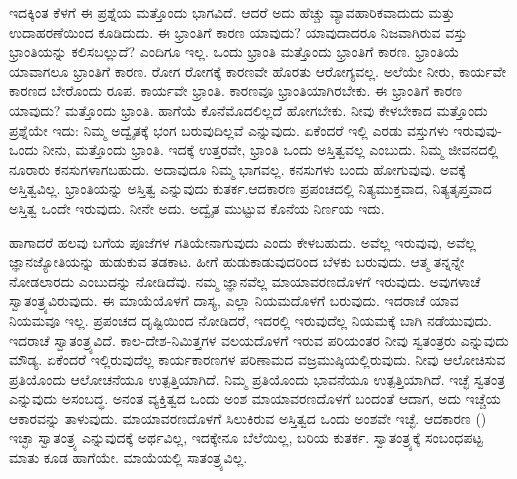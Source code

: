 ಇದಕ್ಕಿಂತ ಕೆಳಗೆ ಈ ಪ್ರಶ್ನೆಯ ಮತ್ತೊಂದು ಭಾಗವಿದೆ. ಆದರೆ ಅದು ಹೆಚ್ಚು ವ್ಯಾವಹಾರಿಕವಾದುದು ಮತ್ತು ಉದಾಹರಣೆಯಿಂದ ಕೂಡಿದುದು. ಈ ಭ್ರಾಂತಿಗೆ ಕಾರಣ ಯಾವುದು? ಯಾವುದಾದರೂ ನಿಜವಾಗಿರುವ ವಸ್ತು ಭ್ರಾಂತಿಯನ್ನು ಕಲಿಸಬಲ್ಲುದೆ? ಎಂದಿಗೂ ಇಲ್ಲ. ಒಂದು ಭ್ರಾಂತಿ ಮತ್ತೊಂದು ಭ್ರಾಂತಿಗೆ ಕಾರಣ. ಭ್ರಾಂತಿಯೆ ಯಾವಾಗಲೂ ಭ್ರಾಂತಿಗೆ ಕಾರಣ. ರೋಗ ರೋಗಕ್ಕೆ ಕಾರಣವೇ ಹೊರತು ಆರೋಗ್ಯವಲ್ಲ. ಅಲೆಯೇ ನೀರು, ಕಾರ್ಯವೇ ಕಾರಣದ ಬೇರೊಂದು ರೂಪ. ಕಾರ್ಯವೇ ಭ್ರಾಂತಿ. ಕಾರಣವೂ ಭ್ರಾಂತಿಯಾಗಿರಬೇಕು. ಈ ಭ್ರಾಂತಿಗೆ ಕಾರಣ ಯಾವುದು? ಮತ್ತೊಂದು ಭ್ರಾಂತಿ. ಹಾಗೆಯೆ ಕೊನೆಮೊದಲಿಲ್ಲದೆ ಹೋಗಬೇಕು. ನೀವು ಕೇಳಬೇಕಾದ ಮತ್ತೊಂದು ಪ್ರಶ್ನೆಯೇ ಇದು: ನಿಮ್ಮ ಅದ್ವೈತಕ್ಕೆ ಭಂಗ ಬರುವುದಿಲ್ಲವೆ ಎನ್ನುವುದು. ಏಕೆಂದರೆ ಇಲ್ಲಿ ಎರಡು ವಸ್ತುಗಳು ಇರುವುವು-ಒಂದು ನೀನು, ಮತ್ತೊಂದು ಭ್ರಾಂತಿ. ಇದಕ್ಕೆ ಉತ್ತರವೇ, ಭ್ರಾಂತಿ ಒಂದು ಅಸ್ತಿತ್ವವಲ್ಲ ಎಂಬುದು. ನಿಮ್ಮ ಜೀವನದಲ್ಲಿ ನೂರಾರು ಕನಸುಗಳಾಗಬಹುದು. ಅದಾವುದೂ ನಿಮ್ಮ ಭಾಗವಲ್ಲ. ಕನಸುಗಳು ಬಂದು ಹೋಗುವುವು. ಅವಕ್ಕೆ ಅಸ್ತಿತ್ವವಿಲ್ಲ. ಭ್ರಾಂತಿಯನ್ನು ಅಸ್ತಿತ್ವ ಎನ್ನುವುದು ಕುತರ್ಕ.\break ಆದಕಾರಣ ಪ್ರಪಂಚದಲ್ಲಿ ನಿತ್ಯಮುಕ್ತವಾದ, ನಿತ್ಯತೃಪ್ತವಾದ ಅಸ್ತಿತ್ವ ಒಂದೇ ಇರುವುದು. ನೀನೇ ಅದು. ಅದ್ವೈತ ಮುಟ್ಟುವ ಕೊನೆಯ ನಿರ್ಣಯ ಇದು.

ಹಾಗಾದರೆ ಹಲವು ಬಗೆಯ ಪೂಜೆಗಳ ಗತಿಯೇನಾಗುವುದು ಎಂದು ಕೇಳಬಹುದು. ಅವೆಲ್ಲ ಇರುವುವು, ಅವೆಲ್ಲ ಜ್ಞಾನಜ್ಯೋತಿಯನ್ನು ಹುಡುಕುವ ತಡಕಾಟ. ಹೀಗೆ ಹುಡುಕಾಡುವುದರಿಂದ ಬೆಳಕು ಬರುವುದು. ಆತ್ಮ ತನ್ನನ್ನೇ ನೋಡಲಾರದು ಎಂಬುದನ್ನು ನೋಡಿದೆವು. ನಮ್ಮ ಜ್ಞಾನವೆಲ್ಲ ಮಾಯಾವರಣದೊಳಗೆ ಇರುವುದು. ಅವುಗಳಾಚೆ ಸ್ವಾತಂತ್ರ್ಯವಿರುವುದು. ಈ ಮಾಯೆಯೊಳಗೆ ದಾಸ್ಯ, ಎಲ್ಲಾ ನಿಯಮದೊಳಗೆ ಬರುವುದು. ಇದರಾಚೆ ಯಾವ ನಿಯಮವೂ ಇಲ್ಲ. ಪ್ರಪಂಚದ ದೃಷ್ಟಿಯಿಂದ ನೋಡಿದರೆ, ಇದರಲ್ಲಿ ಇರುವುದೆಲ್ಲ ನಿಯಮಕ್ಕೆ ಬಾಗಿ ನಡೆಯುವುದು. ಇದರಾಚೆ ಸ್ವಾತಂತ್ರ್ಯವಿದೆ. ಕಾಲ-ದೇಶ-ನಿಮಿತ್ತಗಳ ವಲಯದೊಳಗೆ ಇರುವ ಪರಿಯಂತರ ನೀವು ಸ್ವತಂತ್ರರು ಎನ್ನುವುದು ಮೌಡ್ಯ. ಏಕೆಂದರೆ ಇಲ್ಲಿರುವುದೆಲ್ಲ ಕಾರ್ಯಕಾರಣಗಳ ಪರಿಣಾಮದ ವಜ್ರಮುಷ್ಠಿಯಲ್ಲಿರುವುದು. ನೀವು ಆಲೋಚಿಸುವ ಪ್ರತಿಯೊಂದು ಆಲೋಚನೆಯೂ ಉತ್ಪತ್ತಿಯಾಗಿದೆ. ನಿಮ್ಮ ಪ್ರತಿಯೊಂದು ಭಾವನೆಯೂ ಉತ್ಪತ್ತಿಯಾಗಿದೆ. ಇಚ್ಛೆ ಸ್ವತಂತ್ರ ಎನ್ನುವುದು ಅಸಂಬದ್ಧ. ಅನಂತ ವ್ಯಕ್ತಿತ್ವದ ಒಂದು ಅಂಶ ಮಾಯಾವರಣದೊಳಗೆ ಬಂದಂತೆ ಆದಾಗ, ಅದು ಇಚ್ಚೆಯ ಆಕಾರವನ್ನು ತಾಳುವುದು. ಮಾಯಾವರಣದೊಳಗೆ ಸಿಲುಕಿರುವ ಅಸ್ತಿತ್ವದ ಒಂದು ಅಂಶವೇ ಇಚ್ಛೆ. ಆದಕಾರಣ () ಇಚ್ಛಾ ಸ್ವಾತಂತ್ರ್ಯ ಎನ್ನುವುದಕ್ಕೆ ಅರ್ಥವಿಲ್ಲ, ಇದಕ್ಕೇನೂ ಬೆಲೆಯಿಲ್ಲ, ಬರಿಯ ಕುತರ್ಕ. ಸ್ವಾತಂತ್ರ್ಯಕ್ಕೆ ಸಂಬಂಧಪಟ್ಟ ಮಾತು ಕೂಡ ಹಾಗೆಯೇ. ಮಾಯೆಯಲ್ಲಿ ಸಾತಂತ್ರ್ಯವಿಲ್ಲ.

